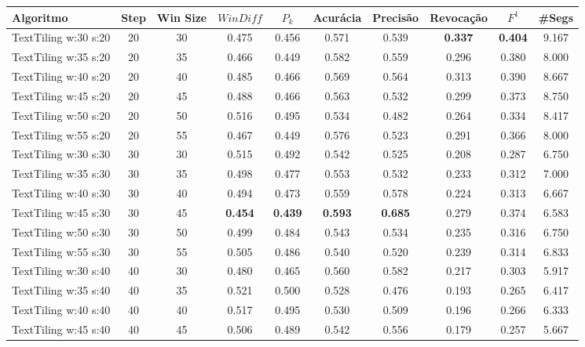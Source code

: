 \documentclass{article}
\begin{document}
 

\begin{longtable}[c]{|l|c|c|c|c|c|c|c|c|c|} 
\hline 
Algoritmo & Step & Win Size & $WinDiff$ & $P_k$ & Acurácia & Precisão & Revocação & $F^1$ & \#Segs\\ \hline 
TextTiling w:30 s:20 & 20 & 30 & 0.475 & 0.456 & 0.571 & 0.539 & \cellcolor{gray!20} \textbf{0.337} & \cellcolor{gray!20} \textbf{0.404} & 9.167  \\ \hline 
 TextTiling w:35 s:20 & 20 & 35 & 0.466 & 0.449 & 0.582 & 0.559 & 0.296 & 0.380 & 8.000  \\ \hline 
 TextTiling w:40 s:20 & 20 & 40 & 0.485 & 0.466 & 0.569 & 0.564 & 0.313 & 0.390 & 8.667  \\ \hline 
 TextTiling w:45 s:20 & 20 & 45 & 0.488 & 0.466 & 0.563 & 0.532 & 0.299 & 0.373 & 8.750  \\ \hline 
 TextTiling w:50 s:20 & 20 & 50 & 0.516 & 0.495 & 0.534 & 0.482 & 0.264 & 0.334 & 8.417  \\ \hline 
 TextTiling w:55 s:20 & 20 & 55 & 0.467 & 0.449 & 0.576 & 0.523 & 0.291 & 0.366 & 8.000  \\ \hline 
 TextTiling w:30 s:30 & 30 & 30 & 0.515 & 0.492 & 0.542 & 0.525 & 0.208 & 0.287 & 6.750  \\ \hline 
 TextTiling w:35 s:30 & 30 & 35 & 0.498 & 0.477 & 0.553 & 0.532 & 0.233 & 0.312 & 7.000  \\ \hline 
 TextTiling w:40 s:30 & 30 & 40 & 0.494 & 0.473 & 0.559 & 0.578 & 0.224 & 0.313 & 6.667  \\ \hline 
 TextTiling w:45 s:30 & 30 & 45 & \cellcolor{gray!20} \textbf{0.454} & \cellcolor{gray!20} \textbf{0.439} & \cellcolor{gray!20} \textbf{0.593} & \cellcolor{gray!20} \textbf{0.685} & 0.279 & 0.374 & 6.583  \\ \hline 
 TextTiling w:50 s:30 & 30 & 50 & 0.499 & 0.484 & 0.543 & 0.534 & 0.235 & 0.316 & 6.750  \\ \hline 
 TextTiling w:55 s:30 & 30 & 55 & 0.505 & 0.486 & 0.540 & 0.520 & 0.239 & 0.314 & 6.833  \\ \hline 
 TextTiling w:30 s:40 & 40 & 30 & 0.480 & 0.465 & 0.560 & 0.582 & 0.217 & 0.303 & 5.917  \\ \hline 
 TextTiling w:35 s:40 & 40 & 35 & 0.521 & 0.500 & 0.528 & 0.476 & 0.193 & 0.265 & 6.417  \\ \hline 
 TextTiling w:40 s:40 & 40 & 40 & 0.517 & 0.495 & 0.530 & 0.509 & 0.196 & 0.266 & 6.333  \\ \hline 
 TextTiling w:45 s:40 & 40 & 45 & 0.506 & 0.489 & 0.542 & 0.556 & 0.179 & 0.257 & 5.667  \\ \hline 

\end{longtable}
\end{document}
